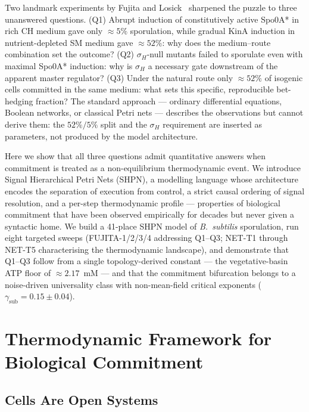 \documentclass[11pt,a4paper]{article}
\begin{document}
Two landmark experiments by Fujita and Losick~\cite{Fujita2005}
sharpened the puzzle to three unanswered questions.
(Q1) Abrupt induction of constitutively active Spo0A* in rich CH medium
gave only $\approx 5\%$ sporulation, while gradual KinA induction in
nutrient-depleted SM medium gave $\approx 52\%$: why does the
medium–route combination set the outcome?
(Q2) $\sigma_H$-null mutants failed to sporulate even with maximal Spo0A*
induction: why is $\sigma_H$ a necessary gate downstream of the
apparent master regulator?
(Q3) Under the natural route only $\approx 52\%$ of isogenic cells
committed in the same medium: what sets this specific, reproducible
bet-hedging fraction?
The standard approach — ordinary differential equations, Boolean
networks, or classical Petri nets — describes the observations
but cannot derive them: the $52\%/5\%$ split and the $\sigma_H$
requirement are inserted as parameters, not produced by the
model architecture.

Here we show that all three questions admit quantitative answers when
commitment is treated as a non-equilibrium thermodynamic event.
We introduce Signal Hierarchical Petri Nets (SHPN), a modelling
language whose architecture encodes the separation of execution from
control, a strict causal ordering of signal resolution, and a per-step
thermodynamic profile — properties of biological commitment that
have been observed empirically for decades but never given a syntactic
home.
We build a 41-place SHPN model of \textit{B.~subtilis} sporulation,
run eight targeted sweeps (FUJITA-1/2/3/4 addressing Q1–Q3;
NET-T1 through NET-T5 characterising the thermodynamic landscape),
and demonstrate that Q1–Q3 follow from a single topology-derived
constant — the vegetative-basin ATP floor of $\approx 2.17$~mM —
and that the commitment bifurcation belongs to a noise-driven
universality class with non-mean-field critical exponents
($\gamma_{\mathrm{sub}} = 0.15 \pm 0.04$).

\section{Thermodynamic Framework for Biological Commitment}
\label{sec:physics}

\subsection{Cells Are Open Systems}
\end{document}
